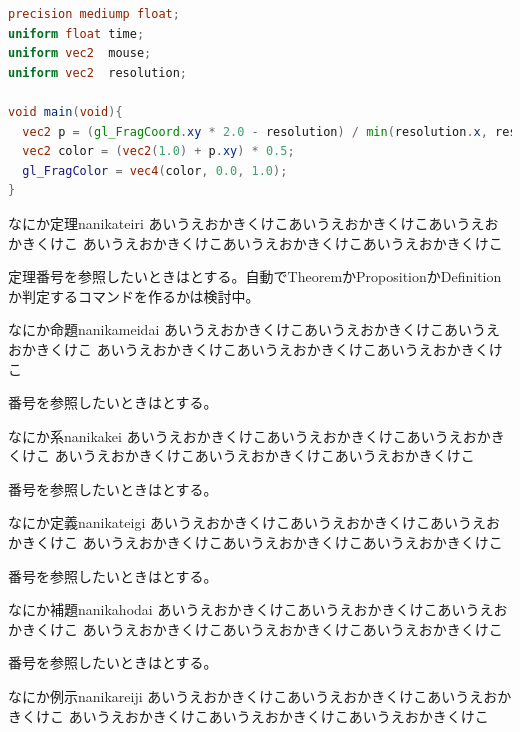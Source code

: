 \documentclass[uplatex,dvipdfmx,ja=standard,a4paper]{bxjsarticle}
\begin{document}
\lstset{
  style=customlst,
}
\begin{lstlisting}[caption = hoge , label = hoge ,language=GLSL]
precision mediump float;
uniform float time;
uniform vec2  mouse;
uniform vec2  resolution;

void main(void){
  vec2 p = (gl_FragCoord.xy * 2.0 - resolution) / min(resolution.x, resolution.y);
  vec2 color = (vec2(1.0) + p.xy) * 0.5;
  gl_FragColor = vec4(color, 0.0, 1.0);
}
\end{lstlisting}

\begin{theorem}{なにか定理}{nanikateiri}
あいうえおかきくけこあいうえおかきくけこあいうえおかきくけこ
あいうえおかきくけこあいうえおかきくけこあいうえおかきくけこ
\end{theorem}

定理番号を参照したいときはとする。自動でTheoremかPropositionかDefinitionか判定するコマンドを作るかは検討中。


\begin{prop}{なにか命題}{nanikameidai}
あいうえおかきくけこあいうえおかきくけこあいうえおかきくけこ
あいうえおかきくけこあいうえおかきくけこあいうえおかきくけこ
\end{prop}

番号を参照したいときはとする。

\begin{cor}{なにか系}{nanikakei}
あいうえおかきくけこあいうえおかきくけこあいうえおかきくけこ
あいうえおかきくけこあいうえおかきくけこあいうえおかきくけこ
\end{cor}

番号を参照したいときはとする。

\begin{definition}{なにか定義}{nanikateigi}
あいうえおかきくけこあいうえおかきくけこあいうえおかきくけこ
あいうえおかきくけこあいうえおかきくけこあいうえおかきくけこ
\end{definition}

番号を参照したいときはとする。

\begin{lemma}{なにか補題}{nanikahodai}
あいうえおかきくけこあいうえおかきくけこあいうえおかきくけこ
あいうえおかきくけこあいうえおかきくけこあいうえおかきくけこ
\end{lemma}

番号を参照したいときはとする。

\begin{example}{なにか例示}{nanikareiji}
あいうえおかきくけこあいうえおかきくけこあいうえおかきくけこ
あいうえおかきくけこあいうえおかきくけこあいうえおかきくけこ
\end{example}
\end{document}
